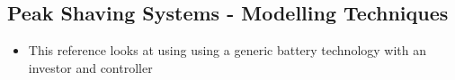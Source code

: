 \subsection{Peak Shaving Systems - Modelling
Techniques}\label{peak-shaving-systems---modelling-techniques}

\begin{itemize}
\tightlist
\item
  \cite{Leadbetter2012685} This reference looks at using using a generic
  battery technology with an investor and controller
\end{itemize}
